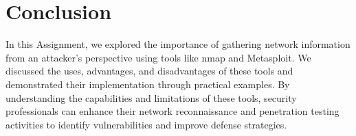 \documentclass[11pt]{article}
\begin{document}
\section{Conclusion}
In this Assignment, we explored the importance of gathering network information from an attacker's perspective using tools like nmap and Metasploit. We discussed the uses, advantages, and disadvantages of these tools and demonstrated their implementation through practical examples. By understanding the capabilities and limitations of these tools, security professionals can enhance their network reconnaissance and penetration testing activities to identify vulnerabilities and improve defense strategies.
\clearpage

\pagebreak
\end{document}
